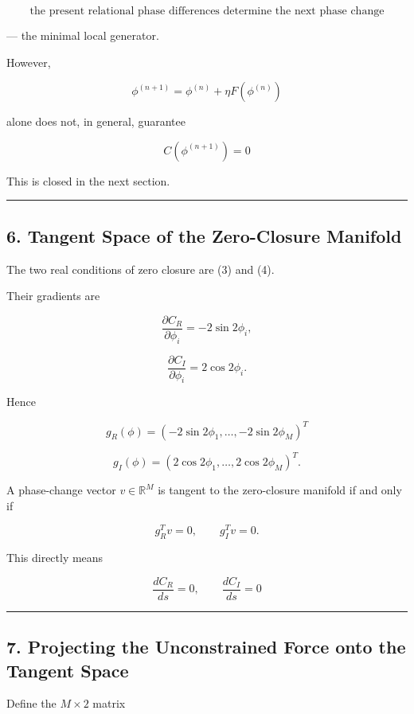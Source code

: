 \documentclass[
  a4paper,
]{article}
\begin{document}
\[
\boxed{
\text{the present relational phase differences determine the next phase change}
}
\]

--- the minimal local generator.

However,

\[
\phi^{(n+1)}
=
\phi^{(n)}
+
\eta F(\phi^{(n)})
\]

alone does not, in general, guarantee

\[
C(\phi^{(n+1)})=0
\]

This is closed in the next section.

\begin{center}\rule{0.5\linewidth}{0.5pt}\end{center}

\subsection{6. Tangent Space of the Zero-Closure
Manifold}\label{tangent-space-of-the-zero-closure-manifold}

The two real conditions of zero closure are (3) and (4).

Their gradients are

\[
\frac{\partial C_R}{\partial\phi_i}
=
-2\sin2\phi_i,
\]

\[
\frac{\partial C_I}{\partial\phi_i}
=
2\cos2\phi_i.
\]

Hence

\[
\boxed{
g_R(\phi)
=
(-2\sin2\phi_1,\ldots,-2\sin2\phi_M)^T
}
\tag{17}
\]

\[
\boxed{
g_I(\phi)
=
(2\cos2\phi_1,\ldots,2\cos2\phi_M)^T.
}
\tag{18}
\]

A phase-change vector \(v\in\mathbb R^M\) is tangent to the zero-closure
manifold if and only if

\[
g_R^Tv=0,
\qquad
g_I^Tv=0.
\tag{19}
\]

This directly means

\[
\frac{dC_R}{ds}=0,
\qquad
\frac{dC_I}{ds}=0
\]

\begin{center}\rule{0.5\linewidth}{0.5pt}\end{center}

\subsection{7. Projecting the Unconstrained Force onto the Tangent
Space}\label{projecting-the-unconstrained-force-onto-the-tangent-space}

Define the \(M\times2\) matrix
\end{document}
